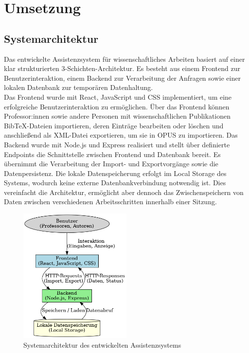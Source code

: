 \chapter{Umsetzung}

\section{Systemarchitektur}
Das entwickelte Assistenzsystem für wissenschaftliches Arbeiten basiert auf einer klar strukturierten 3-Schichten-Architektur. 
Es besteht aus einem Frontend zur Benutzerinteraktion, einem Backend zur Verarbeitung der Anfragen sowie einer lokalen Datenbank 
zur temporären Datenhaltung.\\

\noindent Das Frontend wurde mit React, JavaScript und CSS implementiert, um eine erfolgreiche Benutzerinteraktion zu ermöglichen. 
Über das Frontend können Professor:innen sowie andere Personen mit wissenschaftlichen Publikationen BibTeX-Dateien importieren, 
deren Einträge bearbeiten oder löschen und anschließend als XML-Datei exportieren, um sie in OPUS zu importieren. Das Backend 
wurde mit Node.js und Express realisiert und stellt über definierte Endpoints die Schnittstelle zwischen Frontend und Datenbank 
bereit. Es übernimmt die Verarbeitung der Import- und Exportvorgänge sowie die Datenpersistenz. Die lokale Datenspeicherung 
erfolgt im Local Storage des Systems, wodurch keine externe Datenbankverbindung notwendig ist. Dies vereinfacht die Architektur, 
ermöglicht aber dennoch das Zwischenspeichern von Daten zwischen verschiedenen Arbeitsschritten innerhalb einer Sitzung.

\begin{figure}[h]
    \centering
    \includegraphics[width=0.5\textwidth]{Graphics/systemarchitektur_diagramm.png}
    \caption{Systemarchitektur des entwickelten Assistenzsystems}
    \label{fig:systemarchitektur}
\end{figure}


